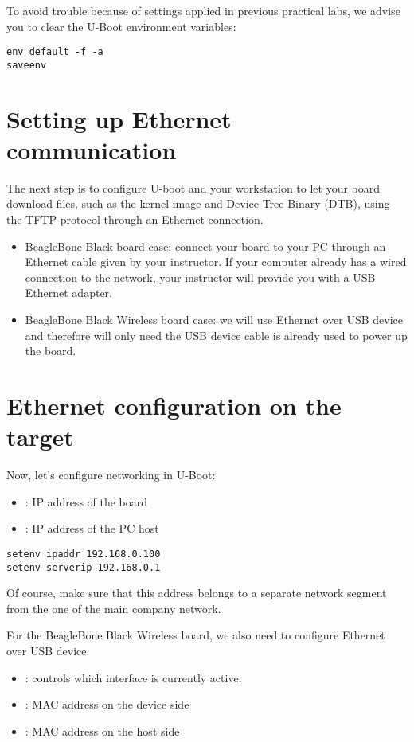 To avoid trouble because of settings applied in previous practical labs,
we advise you to clear the U-Boot environment variables:

\begin{verbatim}
env default -f -a
saveenv
\end{verbatim}

\section{Setting up Ethernet communication}

The next step is to configure U-boot and your workstation to let your
board download files, such as the kernel image and Device Tree Binary
(DTB), using the TFTP protocol through an Ethernet connection.

\begin{itemize} 
\item BeagleBone Black board case: connect your board to your PC
      through an Ethernet cable given by your instructor.
      If your computer already has a wired connection
      to the network, your instructor will provide you with a USB Ethernet
      adapter.
\item BeagleBone Black Wireless board case: we will use Ethernet
      over USB device and therefore will only need the USB device cable
      is already used to power up the board.
\end{itemize}

\section{Ethernet configuration on the target}
Now, let's configure networking in U-Boot:

\begin{itemize}
  \item {}: IP address of the board
  \item {}: IP address of the PC host
\end{itemize}

\begin{verbatim}
setenv ipaddr 192.168.0.100
setenv serverip 192.168.0.1
\end{verbatim}

Of course, make sure that this address belongs to a separate network
segment from the one of the main company network.

For the BeagleBone Black Wireless board, we also need to configure
Ethernet over USB device:
\begin{itemize}
  \item {}: controls which interface is currently active.
  \item {}: MAC address on the device side
  \item {}: MAC address on the host side  
\end{itemize}

